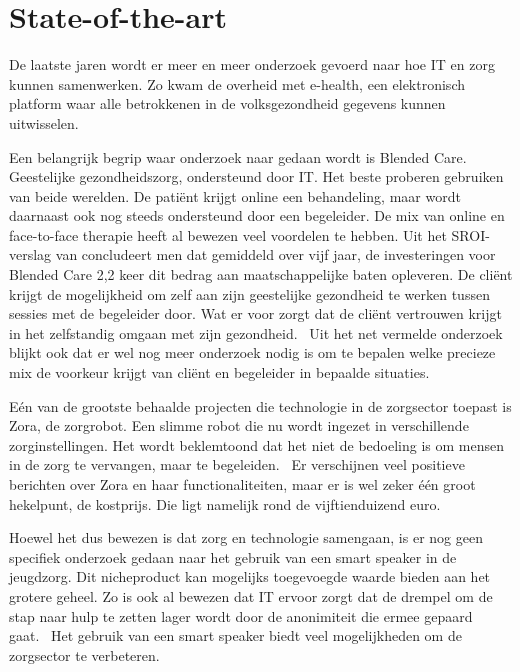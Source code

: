 
\section{State-of-the-art}
\label{sec:state-of-the-art}

De laatste jaren wordt er meer en meer onderzoek gevoerd naar hoe IT en zorg kunnen samenwerken. Zo kwam de overheid met e-health, een elektronisch platform waar alle betrokkenen in de volksgezondheid gegevens kunnen uitwisselen.\autocite{Datanews2012}

Een belangrijk begrip waar onderzoek naar gedaan wordt is Blended Care. Geestelijke gezondheidszorg, ondersteund door IT. Het beste proberen gebruiken van beide werelden. De patiënt krijgt online een behandeling, maar wordt daarnaast ook nog steeds ondersteund door een begeleider. De mix van online en face-to-face therapie heeft al bewezen veel voordelen te hebben. Uit het SROI-verslag van \autocite{Stil2016} concludeert men dat gemiddeld over vijf jaar, de investeringen voor Blended Care 2,2 keer dit bedrag aan maatschappelijke baten opleveren. De cliënt krijgt de mogelijkheid om zelf aan zijn geestelijke gezondheid te werken tussen sessies met de begeleider door. Wat er voor zorgt dat de cliënt vertrouwen krijgt in het zelfstandig omgaan met zijn gezondheid.~\autocite{Wentzel2016} Uit het net vermelde onderzoek blijkt ook dat er wel nog meer onderzoek nodig is om te bepalen welke precieze mix de voorkeur krijgt van cliënt en begeleider in bepaalde situaties.

Eén van de grootste behaalde projecten die technologie in de zorgsector toepast is Zora, de zorgrobot. Een slimme robot die nu wordt ingezet in verschillende zorginstellingen. Het wordt beklemtoond dat het niet de bedoeling is om mensen in de zorg te vervangen, maar te begeleiden.~\autocite{Grypdonck2015} Er verschijnen veel positieve berichten over Zora en haar functionaliteiten, maar er is wel zeker één groot hekelpunt, de kostprijs. Die ligt namelijk rond de vijftienduizend euro.~\autocite{Jongejan2016}

Hoewel het dus bewezen is dat zorg en technologie samengaan, is er nog geen specifiek onderzoek gedaan naar het gebruik van een smart speaker in de jeugdzorg. Dit nicheproduct kan mogelijks toegevoegde waarde bieden aan het grotere geheel. Zo is ook al bewezen dat IT ervoor zorgt dat de drempel om de stap naar hulp te zetten lager wordt door de anonimiteit die ermee gepaard gaat.~\autocite{Stil2016} Het gebruik van een smart speaker biedt veel mogelijkheden om de zorgsector te verbeteren.

